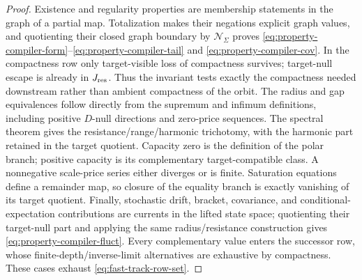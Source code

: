 \documentclass[11pt]{article}
\numberwithin{section}{part}
\theoremstyle{plain}
\theoremstyle{definition}
\theoremstyle{remark}
\newcommand{\Null}{\mathscr N}
\begin{document}
\begin{proof}
Existence and regularity properties are membership statements in the graph
of a partial map.  Totalization makes their negations explicit graph values,
and quotienting their closed graph boundary by \(\Null_\Sigma\) proves
\eqref{eq:property-compiler-form}--\eqref{eq:property-compiler-tail} and
\eqref{eq:property-compiler-cov}.
In the compactness row only target-visible loss of compactness survives;
target-null escape is already in \(J_{\rm res}\).  Thus the invariant tests
exactly the compactness needed downstream rather than ambient compactness of
the orbit.  The radius and gap equivalences follow
directly from the supremum and infimum definitions, including positive
\(D\)-null directions and zero-price sequences.  The spectral theorem gives
the resistance/range/harmonic trichotomy, with the harmonic part retained in
the target quotient.  Capacity zero is the definition of the polar branch;
positive capacity is its complementary target-compatible class.  A
nonnegative scale-price series either diverges or is finite.  Saturation
equations define a remainder map, so closure of the equality branch is
exactly vanishing of its target quotient.  Finally, stochastic drift,
bracket, covariance, and conditional-expectation contributions are currents
in the lifted state space; quotienting their target-null part and applying
the same radius/resistance construction gives
\eqref{eq:property-compiler-fluct}.  Every complementary value enters the
successor row, whose finite-depth/inverse-limit alternatives are exhaustive by
compactness.  These cases exhaust
\eqref{eq:fast-track-row-set}.
\end{proof}
\end{document}
